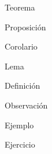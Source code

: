 \documentclass[12pt]{report}
\theoremstyle{largebreak}
\begin{document}
    \newpage

    \begin{theor}[Nombre]
        Teorema
    \end{theor}

    \begin{propo}[Nombre]
        Proposición
    \end{propo}

    \begin{cor}[Nombre]
        Corolario
    \end{cor}

    \begin{lema}[Nombre]
        Lema
    \end{lema}

    \begin{mydef}[Nombre]
        Definición
    \end{mydef}

    \begin{obs}[Nombre]
        Observación
    \end{obs}

    \begin{exa}[Nombre]
        Ejemplo
    \end{exa}

    \begin{excer}[Nombre]
        Ejercicio
    \end{excer}
\end{document}
